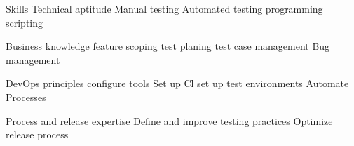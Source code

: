 Skills
  Technical aptitude 
    Manual testing 
    Automated testing 
    programming 
    scripting

  Business knowledge
    feature scoping 
    test planing 
    test case management
    Bug management 

  DevOps principles
    configure tools
    Set up Cl  
    set up test environments 
    Automate Processes 

  Process and release expertise   
    Define and improve testing practices
    Optimize release process